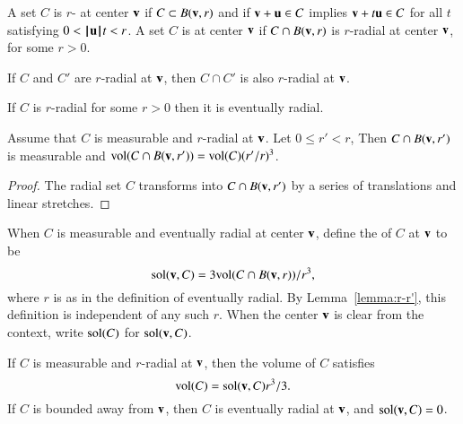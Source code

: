 \begin{definition}[radial]
A set $C$ is $r$- at center ${\mathbf v}$ if  $C\subset B({\mathbf v},r)$
and if
${\mathbf v} + {\mathbf u} \in C$ implies
${\mathbf v} + t {\mathbf u} \in C$ for all $t$ satisfying $0 < {{\hskip0.1em|\hskip-0.15em|\hskip0.1em}{\mathbf u}{\hskip0.1em|\hskip-0.15em|\hskip0.1em}} t < r$.
A set $C$ is  at center ${\mathbf v}$ if $C\cap B({\mathbf v},r)$ is
$r$-radial at center ${\mathbf v}$, for some $r>0$.
%
\end{definition}
%


\begin{lemma}  If $C$ and $C'$ are  $r$-radial
at ${\mathbf v}$, then $C\cap C'$ is also $r$-radial at
${\mathbf v}$.
\end{lemma}

\begin{lemma}
If $C$ is $r$-radial for some $r>0$ then it is eventually radial.
\end{lemma}

\begin{lemma}\label{lemma:r-r'}
Assume that $C$ is measurable and $r$-radial at ${\mathbf v}$.  Let $0\le
r'<r$, Then $C\cap B({\mathbf v},r')$ is measurable and ${\operatorname{vol}}(C\cap
B({\mathbf v},r')) = {\operatorname{vol}}(C) (r'/r)^3$.
\end{lemma}

\begin{proof}  The radial set $C$ transforms into $C\cap B({\mathbf v},r')$ by
a series of translations and linear stretches.
\end{proof}


\begin{definition}\label{def:sol}
When $C$ is measurable and eventually radial at center ${\mathbf v}$, 
define the  of $C$ at ${\mathbf v}$ to be
\begin{displaymath}
\operatorname{sol}({\mathbf v},C) = 3 {\operatorname{vol}}(C\cap B({\mathbf v},r))/r^3,
\end{displaymath}
where $r$ is as in the definition of eventually radial. 
By Lemma~\ref{lemma:r-r'}, this
definition is independent of any such $r$.  When the center ${\mathbf v}$ is
clear from the context, write $\operatorname{sol}(C)$ for
$\operatorname{sol}({\mathbf v},C)$.
%
%
\end{definition}


\begin{lemma}
If $C$ is measurable and $r$-radial at ${\mathbf v}$, then the volume of $C$
satisfies
\begin{displaymath}
{\operatorname{vol}}(C) = \operatorname{sol}({\mathbf v},C) r^3/3.
\end{displaymath}
If $C$ is bounded away from ${\mathbf v}$, then $C$ is eventually radial at
${\mathbf v}$, and $\operatorname{sol}({\mathbf v},C) = 0$.
%
\end{lemma}

